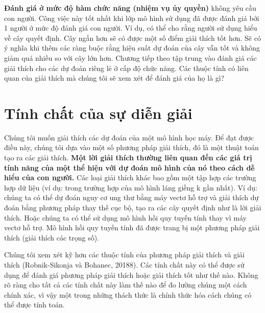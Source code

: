 \textbf{Đánh giá ở mức độ hàm chức năng (nhiệm vụ ủy quyền)} không yêu cầu con người. Công việc này tốt nhất khi lớp mô hình sử dụng đã được đánh giá bởi 1 người ở mức độ đánh giá con người. Ví dụ, có thể cho rằng người sử dụng hiểu về cây quyết định. Cây ngắn hơn sẽ có được một số điểm giải thích tốt hơn. Sẽ có ý nghĩa khi thêm các ràng buộc rằng hiệu suất dự đoán của cây vẫn tốt và không giảm quá nhiều so với cây lớn hơn.
Chương tiếp theo tập trung vào đánh giá các giải thích cho các dự đoán riêng lẻ ở cấp độ chức năng. Các thuộc tính có liên quan của giải thích mà chúng tôi sẽ xem xét để đánh giá của họ là gì?

\clearpage

\section{Tính chất của sự diễn giải}

Chúng tôi muốn giải thích các dự đoán của một mô hình học máy. Để đạt được điều này, chúng tôi dựa vào một số phương pháp giải thích, đó là một thuật toán tạo ra các giải thích. \textbf{Một lời giải thích thường liên quan đến các giá trị tính năng của một thể hiện với dự đoán mô hình của nó theo cách dễ hiểu của con người.} Các loại giải thích khác bao gồm một tập hợp các trường hợp dữ liệu (ví dụ: trong trường hợp của mô hình láng giềng k gần nhất). Ví dụ: chúng ta có thể dự đoán nguy cơ ung thư bằng máy vectơ hỗ trợ và giải thích dự đoán bằng phương pháp thay thế cục bộ, tạo ra các cây quyết định như là lời giải thích. Hoặc chúng ta có thể sử dụng mô hình hồi quy tuyến tính thay vì máy vectơ hỗ trợ. Mô hình hồi quy tuyến tính đã được trang bị một phương pháp giải thích (giải thích các trọng số).

Chúng tôi xem xét kỹ hơn các thuộc tính của phương pháp giải thích và giải thích (Robnik-Sikonja và Bohanec, 20188). Các tính chất này có thể được sử dụng để đánh giá phương pháp giải thích hoặc giải thích tốt như thế nào. Không rõ ràng cho tất cả các tính chất này làm thế nào để đo lường chúng một cách chính xác, vì vậy một trong những thách thức là chính thức hóa cách chúng có thể được tính toán.

